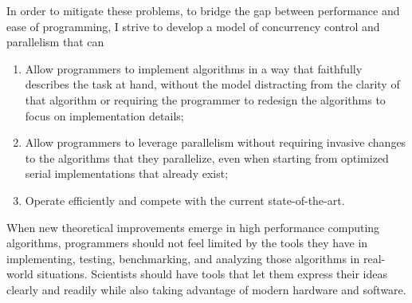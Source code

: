 In order to mitigate these problems, to bridge the gap between performance and
ease of programming, I strive to develop a model of concurrency control and
parallelism that can
\begin{enumerate}
    \item Allow programmers to implement algorithms in a way that faithfully
        describes the task at hand, without the model distracting from the
        clarity of that algorithm or requiring the programmer to redesign the
        algorithms to focus on implementation details;
    \item Allow programmers to leverage parallelism without requiring invasive
        changes to the algorithms that they parallelize, even when starting from
        optimized serial implementations that already exist;
    \item Operate efficiently and compete with the current state-of-the-art.
\end{enumerate}

When new theoretical improvements emerge in high performance computing
algorithms, programmers should not feel limited by the tools they have in
implementing, testing, benchmarking, and analyzing those algorithms in
real-world situations. Scientists should have tools that let them express their
ideas clearly and readily while also taking advantage of modern hardware and
software.

